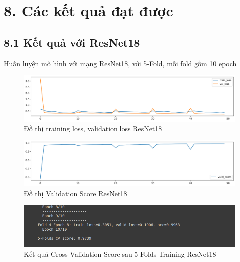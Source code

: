 \documentclass{article}
\begin{document}
	\section{8. Các kết quả đạt được}
	\subsection{8.1 Kết quả với ResNet18}
	Huấn luyện mô hình với mạng ResNet18, với 5-Fold, mỗi fold gồm 10 epoch
	\begin{figure}[H]
		\centering
		\includegraphics[width=1\linewidth]{results/resnet18/training_loss_results.png}
		\caption{Đồ thị training loss, validation loss ResNet18}
		\label{fig:writing-thesis}
	\end{figure}
	\begin{figure}[H]
		\centering
		\includegraphics[width=1\linewidth]{results/resnet18/valid_score_results.png}
		\caption{Đồ thị Validation Score ResNet18}
		\label{fig:writing-thesis}
	\end{figure}
	\begin{figure}[H]
		\centering
		\includegraphics[width=1\linewidth]{results/resnet18/CV_Score_5_Folds_ResNet18.png}
		\caption{Kết quả Cross Validation Score sau 5-Folds Training ResNet18}
		\label{fig:writing-thesis}
	\end{figure}
\end{document}

